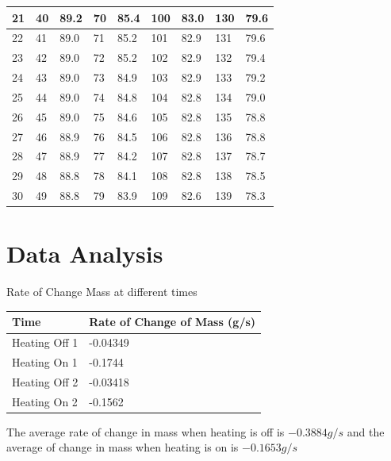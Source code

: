 \begin{center}
\begin{adjustbox}{width=1\textwidth}
\begin{tabular}{|l|l|l|l|l|l|l|l|l|}
21 & 40 & 89.2 & 70 & 85.4 & 100 & 83.0 & 130 & 79.6 \\ \hline
22 & 41 & 89.0 & 71 & 85.2 & 101 & 82.9 & 131 & 79.6 \\ \hline
23 & 42 & 89.0 & 72 & 85.2 & 102 & 82.9 & 132 & 79.4 \\ \hline
24 & 43 & 89.0 & 73 & 84.9 & 103 & 82.9 & 133 & 79.2 \\ \hline
25 & 44 & 89.0 & 74 & 84.8 & 104 & 82.8 & 134 & 79.0 \\ \hline
26 & 45 & 89.0 & 75 & 84.6 & 105 & 82.8 & 135 & 78.8 \\ \hline
27 & 46 & 88.9 & 76 & 84.5 & 106 & 82.8 & 136 & 78.8 \\ \hline
28 & 47 & 88.9 & 77 & 84.2 & 107 & 82.8 & 137 & 78.7 \\ \hline
29 & 48 & 88.8 & 78 & 84.1 & 108 & 82.8 & 138 & 78.5 \\ \hline
30 & 49 & 88.8 & 79 & 83.9 & 109 & 82.6 & 139 & 78.3 \\ \hline
\end{tabular}
\end{adjustbox}
\end{center}



\section{Data Analysis}

Rate of Change Mass at different times 
\begin{center}
\begin{tabular}{|l|l|}
\hline
Time            & Rate of Change of Mass (g/s) \\ \hline
Heating  Off 1  & -0.04349                     \\ \hline
Heating   On 1  & -0.1744                      \\ \hline
Heating   Off 2 & -0.03418                     \\ \hline
Heating   On 2  & -0.1562                      \\ \hline
\end{tabular}
\end{center}
The average rate of change in mass when heating is off is $-0.3884 g/s$ and the average of change in mass when heating is on is $ -0.1653 g/s$

